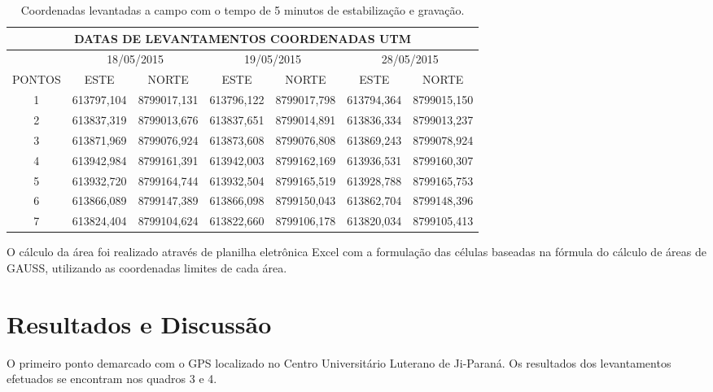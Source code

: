 \documentclass[article,12pt,onesidea,4paper,english,brazil]{abntex2}
\begin{document}
\begin{table}[!h]
	\centering
	\caption{Coordenadas levantadas a campo com o tempo de 5 minutos de estabilização e gravação.}
	\label{my-label}
	\begin{tabular}{|c|c|c|c|c|c|c|}
		\hline
		\multicolumn{7}{|c|}{DATAS DE LEVANTAMENTOS COORDENADAS UTM}                                                 \\ \hline
		& \multicolumn{2}{c|}{18/05/2015} & \multicolumn{2}{c|}{19/05/2015} & \multicolumn{2}{c|}{28/05/2015} \\ \hline
		PONTOS & ESTE           & NORTE          & ESTE           & NORTE          & ESTE           & NORTE          \\ \hline
		1      & 613797,104     & 8799017,131    & 613796,122     & 8799017,798    & 613794,364     & 8799015,150    \\ \hline
		2      & 613837,319     & 8799013,676    & 613837,651     & 8799014,891    & 613836,334     & 8799013,237    \\ \hline
		3      & 613871,969     & 8799076,924    & 613873,608     & 8799076,808    & 613869,243     & 8799078,924    \\ \hline
		4      & 613942,984     & 8799161,391    & 613942,003     & 8799162,169    & 613936,531     & 8799160,307    \\ \hline
		5      & 613932,720     & 8799164,744    & 613932,504     & 8799165,519    & 613928,788     & 8799165,753    \\ \hline
		6      & 613866,089     & 8799147,389    & 613866,098     & 8799150,043    & 613862,704     & 8799148,396    \\ \hline
		7      & 613824,404     & 8799104,624    & 613822,660     & 8799106,178    & 613820,034     & 8799105,413    \\ \hline
	\end{tabular}
\end{table}

O cálculo da área foi realizado através de planilha eletrônica Excel com a formulação das células baseadas na fórmula do cálculo de áreas de GAUSS, utilizando as coordenadas limites de cada área.

	
	\section*{Resultados e Discussão}
	
	O primeiro ponto demarcado com o GPS localizado no Centro Universitário Luterano de Ji-Paraná.
	Os resultados dos levantamentos efetuados se encontram nos quadros 3 e 4. 
	
\end{document}
